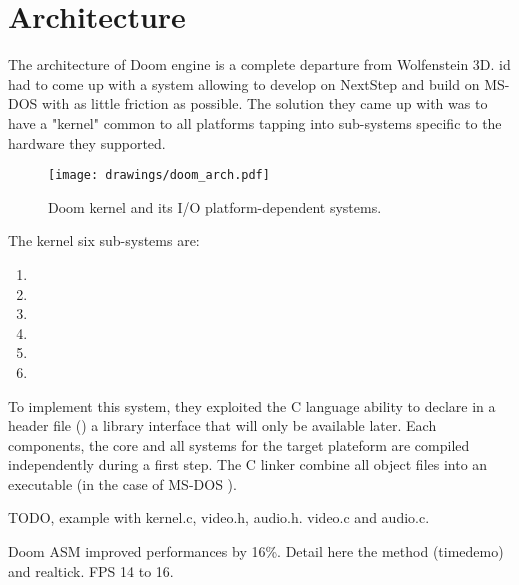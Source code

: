 \section{Architecture}
The architecture of Doom engine is a complete departure from Wolfenstein 3D. id had to come up with a system allowing to develop on NextStep and build on MS-DOS with as little friction as possible. The solution they came up with was to have a "kernel" common to all platforms tapping into sub-systems specific to the hardware they supported.\\
\par
\begin{figure}[H]
\centering
\texttt{[image: drawings/doom\_arch.pdf]}
\caption{Doom kernel and its I/O platform-dependent systems.}
\end{figure}
\par
The kernel six sub-systems are:\\
\par
\begin{enumerate}
\item
\item
\item
\item
\item
\item
\end{enumerate}
To implement this system, they exploited the C language ability to declare in a header file () a library interface that will only be available later. Each components, the core and all systems for the target plateform are compiled independently during a first step. The C linker combine all object files into an executable (in the case of MS-DOS ).\\
\par
TODO, example with kernel.c, video.h, audio.h. video.c and audio.c.\\ 
\par
Doom ASM improved performances by 16\%. Detail here the method (timedemo) and realtick. FPS 14 to 16.\\
\par


\par

\par

